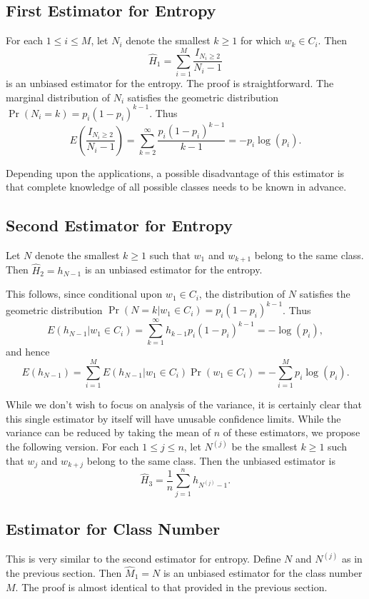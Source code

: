 \documentclass{amsart}
\begin{document}
\subsection*{First Estimator for Entropy}

For each $1 \le i \le M$, let $N_i$ denote the smallest $k \ge 1$ 
for which $w_k \in C_i$.  Then
$$ \hat H_1 = \sum_{i=1}^M \frac{I_{N_i\ge 2}}{N_i-1} $$
is an unbiased estimator for the entropy.  The proof is straightforward.  
The marginal distribution of $N_i$ satisfies the
geometric distribution $\Pr(N_i = k) = p_i (1-p_i)^{k-1}$.  Thus
$$ E\left(\frac{I_{N_i\ge 2}}{N_i-1}\right) = 
\sum_{k=2}^\infty \frac{p_i(1-p_i)^{k-1}}{k-1} = - p_i \log(p_i) .$$

Depending upon the applications, a possible disadvantage of this estimator 
is that complete knowledge of all possible classes
needs to be known in advance.

\subsection*{Second Estimator for Entropy}

Let $N$ denote the smallest $k \ge 1$ such that $w_1$ and
$w_{k+1}$ belong to the same class.  
Then $\hat H_2 = h_{N-1}$ is an unbiased estimator for the entropy.

This follows, since conditional upon $w_1 \in C_i$, 
the distribution of $N$ satisfies the geometric distribution
$\Pr(N = k | w_1 \in C_i) = p_i (1-p_i)^{k-1}$.  Thus
$$ E(h_{N-1} | w_1 \in C_i) = \sum_{k=1}^\infty h_{k-1} p_i (1-p_i)^{k-1} 
   = - \log(p_i) ,$$
and hence
$$ E(h_{N-1}) 
   = \sum_{i=1}^M E(h_{N-1} | w_1 \in C_i) \Pr(w_1 \in C_i) 
   = - \sum_{i=1}^M p_i \log(p_i) .$$

While we don't wish to focus on analysis of the variance, it is certainly 
clear that this single estimator by itself will have
unusable confidence limits.  While the variance can be reduced by taking the 
mean of $n$ of these estimators, we
propose the following version.
For each $1 \le j \le n$, let 
$N^{(j)}$ be the smallest $k \ge 1$ such that $w_j$ and 
$w_{k+j}$ belong to the same class.  Then
the unbiased estimator is
$$ \hat H_3 = \frac1n \sum_{j=1}^n h_{N^{(j)}-1} .$$

\subsection*{Estimator for Class Number}

This is very similar to the second estimator for entropy.  
Define $N$ and $N^{(j)}$ as in the previous section.  
Then $\hat M_1 = N$ is an unbiased estimator for the class number $M$.
The proof is almost identical to that provided in the previous section.
\end{document}
